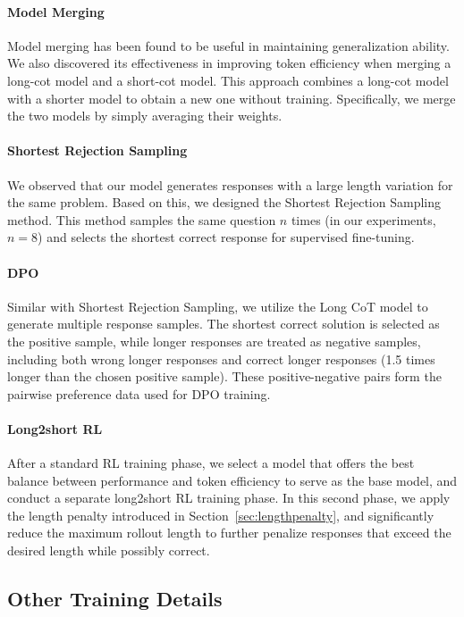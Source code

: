 \documentclass{article}
\begin{document}
\paragraph{Model Merging} Model merging has been found to be useful in maintaining generalization ability. We also discovered its effectiveness in improving token efficiency when merging a long-cot model and a short-cot model. This approach combines a long-cot model with a shorter model to obtain a new one without training. Specifically, we merge the two models by simply averaging their weights.
 \paragraph{Shortest Rejection Sampling} We observed that our model generates responses with a large length variation for the same problem. Based on this, we designed the Shortest Rejection Sampling method. This method samples the same question \(n\) times (in our experiments, \(n=8\)) and selects the shortest correct response for supervised fine-tuning.
 \paragraph{DPO} Similar with Shortest Rejection Sampling, we utilize the Long CoT model to generate multiple response samples. The shortest correct solution is selected as the positive sample, while longer responses are treated as negative samples, including both wrong longer responses and correct longer responses (1.5 times longer than the chosen positive sample). These positive-negative pairs form the pairwise preference data used for DPO training.
 \paragraph{Long2short RL} After a standard RL training phase, we select a model that offers the best balance between performance and token efficiency to serve as the base model, and conduct a separate long2short RL training phase. 
In this second phase, we apply the length penalty introduced in Section~\ref{sec:lengthpenalty}, and significantly reduce the maximum rollout length to further penalize responses that exceed the desired length while possibly correct.

\subsection{Other Training Details}
\label{sec:others}
\end{document}
